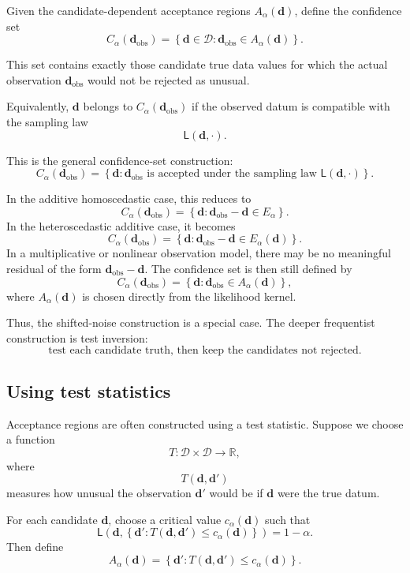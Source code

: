 \documentclass[11pt]{article}
\newcommand{\Dspace}{\mathcal D}
\newcommand{\dobs}{\mathbf d_{\mathrm{obs}}}
\newcommand{\Ealpha}{E_{\alpha}}
\newcommand{\Calpha}{C_{\alpha}}
\begin{document}
Given the candidate-dependent acceptance regions \(A_{\alpha}(\mathbf d)\), define the confidence set
\[
    \Calpha(\dobs)
    =
    \left\{
        \mathbf d\in\Dspace:
        \dobs\in A_{\alpha}(\mathbf d)
    \right\}.
\]

This set contains exactly those candidate true data values for which the actual observation \(\dobs\) would not be rejected as unusual.

Equivalently, \(\mathbf d\) belongs to \(\Calpha(\dobs)\) if the observed datum is compatible with the sampling law
\[
    \mathsf L(\mathbf d,\cdot).
\]

This is the general confidence-set construction:
\[
    \boxed{
    \Calpha(\dobs)
    =
    \left\{
        \mathbf d:
        \dobs
        \text{ is accepted under the sampling law }
        \mathsf L(\mathbf d,\cdot)
    \right\}.
    }
\]

In the additive homoscedastic case, this reduces to
\[
    \Calpha(\dobs)
    =
    \left\{
        \mathbf d:
        \dobs-\mathbf d\in\Ealpha
    \right\}.
\]
In the heteroscedastic additive case, it becomes
\[
    \Calpha(\dobs)
    =
    \left\{
        \mathbf d:
        \dobs-\mathbf d\in\Ealpha(\mathbf d)
    \right\}.
\]
In a multiplicative or nonlinear observation model, there may be no meaningful residual of the form \(\dobs-\mathbf d\). The confidence set is then still defined by
\[
    \Calpha(\dobs)
    =
    \left\{
        \mathbf d:
        \dobs\in A_{\alpha}(\mathbf d)
    \right\},
\]
where \(A_{\alpha}(\mathbf d)\) is chosen directly from the likelihood kernel.

Thus, the shifted-noise construction is a special case. The deeper frequentist construction is test inversion:
\[
    \text{test each candidate truth, then keep the candidates not rejected.}
\]

\subsection{Using test statistics}

Acceptance regions are often constructed using a test statistic. Suppose we choose a function
\[
    T:\Dspace\times\Dspace\to\mathbb R,
\]
where
\[
    T(\mathbf d,\mathbf d')
\]
measures how unusual the observation \(\mathbf d'\) would be if \(\mathbf d\) were the true datum.

For each candidate \(\mathbf d\), choose a critical value \(c_{\alpha}(\mathbf d)\) such that
\[
    \mathsf L
    \left(
        \mathbf d,
        \left\{
            \mathbf d':
            T(\mathbf d,\mathbf d')\leq c_{\alpha}(\mathbf d)
        \right\}
    \right)
    =
    1-\alpha.
\]
Then define
\[
    A_{\alpha}(\mathbf d)
    =
    \left\{
        \mathbf d':
        T(\mathbf d,\mathbf d')\leq c_{\alpha}(\mathbf d)
    \right\}.
\]
\end{document}
